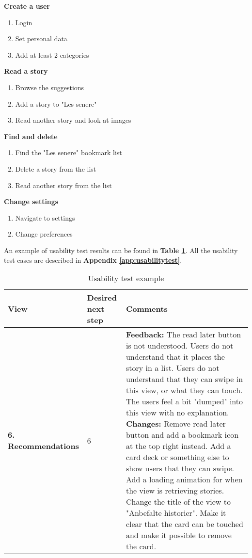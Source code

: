 \textbf{Create a user} 	
	\begin{enumerate}
		\item Login 
		\item Set personal data 
		\item Add at least 2 categories 
	\end{enumerate}
\textbf{Read a story} 
	\begin{enumerate}
		\item Browse the suggestions 
		\item Add a story to "Les senere" 
		\item Read another story and look at images 
	\end{enumerate}
\textbf{Find and delete }
	\begin{enumerate}
		\item Find the "Les senere" bookmark list
		\item Delete a story from the list
		\item Read another story from the list 
	\end{enumerate}
 \textbf{Change settings}
	\begin{enumerate}
		\item Navigate to settings 
		\item Change preferences 
	\end{enumerate}
	


An example of usability test results can be found in \textbf{Table \ref{Tab:usabilityTestexample}}. All the usability test cases are described in \textbf{Appendix \ref{app:usabilitytest}}.

\begin{table}[H]

	\caption{Usability test example }
	\label{Tab:usabilityTestexample}
	\begin{adjustbox}{center}
	\begin{tabular}{ | p{2cm} | p{2cm} | p{13cm}|}	
		\hline
		\textbf{View} & \textbf{Desired next step} & \textbf{Comments}
		\\ \hline
		
		\textbf{6. Recommendations} & 6 & 
		\textbf{Feedback:} The read later button is not understood. Users do not understand that it places the story in a list. Users do not understand that they can swipe in this view, or what they can touch. The users feel a bit "dumped" into this view with no explanation.\newline
		\textbf{Changes:} Remove read later button and add a bookmark icon at the top right instead. Add a card deck or something else to show users that they can swipe. Add a loading animation for when the view is retrieving stories. Change the title of the view to "Anbefalte historier". Make it clear that the card can be touched and make it possible to remove the card.
		\\\hline
	\end{tabular}
\end{adjustbox}
\end{table}
	

